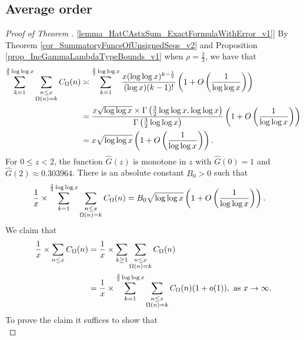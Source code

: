 \documentclass[11pt,reqno,a4letter]{article}
\newcommand{\hlocalref}[1]{\hyperref[#1]{\ref{#1}}}
\numberwithin{equation}{section}
\numberwithin{figure}{section}
\numberwithin{table}{section}
\theoremstyle{plain}
\numberwithin{theorem}{section}
\theoremstyle{definition}
\begin{document}
\subsection{Average order}
\label{subSection_AvgOrdersOfTheUnsignedSequences} 

\begin{proof}[Proof of Theorem \hlocalref{lemma_HatCAstxSum_ExactFormulaWithError_v1}]  
By Theorem \hlocalref{cor_SummatoryFuncsOfUnsignedSeqs_v2} and 
Proposition \hlocalref{prop_IncGammaLambdaTypeBounds_v1} 
when $\rho = \frac{2}{3}$, we have that 
\begin{align} 
\notag 
\sum_{k=1}^{\frac{3}{2} \log\log x} \sum_{\substack{n \leq x \\ \Omega(n) = k}} C_{\Omega}(n) & \asymp 
     \sum_{k=1}^{\frac{3}{2} \log\log x} \frac{x (\log\log x)^{k-\frac{1}{2}}}{(\log x) (k-1)!} 
     \left(1 + O\left(\frac{1}{\log\log x}\right)\right) \\ 
\notag 
     & = \frac{x \sqrt{\log\log x} \times \Gamma\left(\frac{3}{2} \log\log x, \log\log x\right)}{ 
     \Gamma\left(\frac{3}{2} \log\log x\right)} 
     \left(1 + O\left(\frac{1}{\log\log x}\right)\right) \\ 
\notag 
     & = 
     x \sqrt{\log\log x} \left(1 + O\left(\frac{1}{\log\log x}\right)\right). 
\end{align}
For $0 \leq z < 2$, the function $\widehat{G}(z)$ is monotone in 
$z$ with $\widehat{G}(0) = 1$ and $\widehat{G}(2) \approx 0.303964$. 
There is an absolute constant $B_0 > 0$ such that 
\begin{align} 
\notag 
\frac{1}{x} \times \sum_{k=1}^{\frac{3}{2} \log\log x} 
     \sum_{\substack{n \leq x \\ \Omega(n) = k}} C_{\Omega}(n) & = 
     B_0 \sqrt{\log\log x} \left(1 + O\left(\frac{1}{\log\log x}\right)\right). 
\end{align} 
We claim that 
\begin{align} 
\notag 
\frac{1}{x} \times \sum_{n \leq x} C_{\Omega}(n) & = \frac{1}{x} \times 
     \sum_{k \geq 1} \sum_{\substack{n \leq x \\ \Omega(n) = k}} C_{\Omega}(n) \\ 
\notag 
     & = 
     \frac{1}{x} \times \sum_{k=1}^{\frac{3}{2} \log\log x} 
     \sum_{\substack{n \leq x \\ \Omega(n) = k}} 
     C_{\Omega}(n) (1+o(1)), 
     \text{ as } x \rightarrow \infty. 
\end{align} 
To prove the claim it suffices to show that 
\begin{equation} 

\end{equation}
\end{proof}
\end{document}
